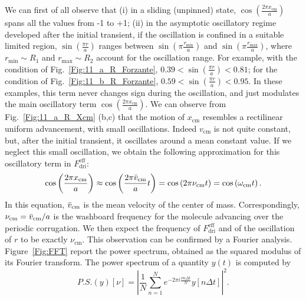 We can first of all observe that (i) in a sliding (unpinned) state, $\cos \left(\frac{2\pi x_\text{cm}}{a}\right)$ spans all the values from -1 to +1; (ii) in the asymptotic oscillatory regime developed after the initial transient, if the oscillation is confined in a suitable limited region, $\sin\left(\frac{\pi r}{a}\right)$ ranges between $\sin\left(\pi\frac{ r_\text{min}}{a}\right)$ and $\sin\left(\pi\frac{ r_\text{max}}{a}\right)$, where $r_\text{min} \sim R_1$ and $r_\text{max} \sim R_2$ account for the oscillation range. For example, with the condition of Fig.~\ref{Fig:11_a_R_Forzante},
$ 0.39 < \sin\left(\frac{\pi r}{a}\right) < 0.81$; for the condition of Fig.~\ref{Fig:11_b_R_Forzante}, $ 0.59 < \sin\left(\frac{\pi r}{a}\right) < 0.95$. In these examples, this term never changes sign during the oscillation, and just modulates the main oscillatory term $\cos \left(\frac{2\pi x_\text{cm}}{a}\right)$. We can observe from Fig.~\ref{Fig:11_a_R_Xcm} (b,c) that the motion of $x_\text{cm}$ resembles a rectilinear uniform advancement, with small oscillations. Indeed $v_\text{cm}$ is not quite constant, but, after the initial transient, it oscillates around a mean constant value. If we neglect this small oscillation, we obtain the following approximation for this oscillatory term in $F_{\text{dri}}^{\text{eff}}$:
\begin{equation}
    \cos \left(\frac{2\pi x_\text{cm}}{a}\right) \approx \cos \left(\frac{2\pi \Bar{v}_\text{cm}}{a}t\right) = \cos\left(2\pi \nu_\text{cm}t\right) = \cos \left(\omega_\text{cm} t\right).
    \label{eq:coswt}
\end{equation}
In this equation, $\Bar{v}_\text{cm}$ is the mean velocity of the center of mass. Correspondingly, $\nu_\text{cm} = \Bar{v}_\text{cm}/a$ is the washboard frequency for the molecule advancing over the periodic corrugation. We then expect the frequency of $F_{\text{dri}}^{\text{eff}}$ and of the oscillation of $r$ to be exactly $\nu_\text{cm}$. This observation can be confirmed by a Fourier analysis. Figure~\ref{Fig:FFT} report the power spectrum, obtained as the squared modulus of its Fourier transform. The power spectrum of a quantity $y(t)$ is computed by
\begin{equation}
    P.S.(y)[\nu] = \left|\frac{1}{N}\sum_{n=1}^N e^{-2\pi i \frac{\nu n \Delta t}{N}}y[n \Delta t]\right|^2.
    \label{eq:ps}
\end{equation}

